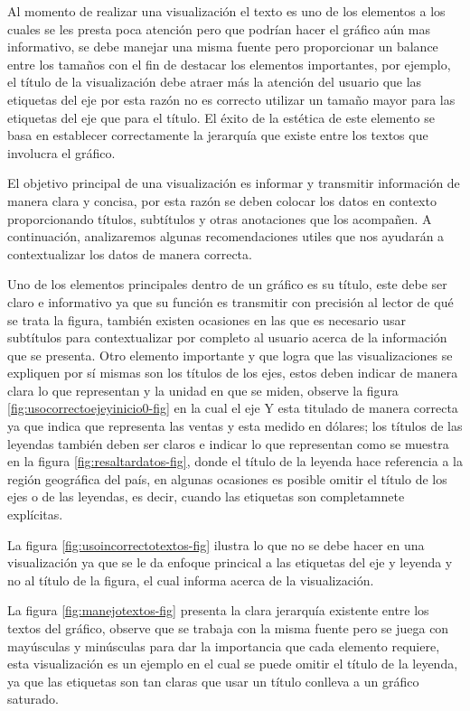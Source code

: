 \documentclass[
]{book}
\begin{document}
Al momento de realizar una visualización el texto es uno de los elementos a los cuales se les presta poca atención pero que podrían hacer el gráfico aún mas informativo, se debe manejar una misma fuente pero proporcionar un balance entre los tamaños con el fin de destacar los elementos importantes, por ejemplo, el título de la visualización debe atraer más la atención del usuario que las etiquetas del eje por esta razón no es correcto utilizar un tamaño mayor para las etiquetas del eje que para el título. El éxito de la estética de este elemento se basa en establecer correctamente la jerarquía que existe entre los textos que involucra el gráfico.

El objetivo principal de una visualización es informar y transmitir información de manera clara y concisa, por esta razón se deben colocar los datos en contexto proporcionando títulos, subtítulos y otras anotaciones que los acompañen. A continuación, analizaremos algunas recomendaciones utiles que nos ayudarán a contextualizar los datos de manera correcta.

Uno de los elementos principales dentro de un gráfico es su título, este debe ser claro e informativo ya que su función es transmitir con precisión al lector de qué se trata la figura, también existen ocasiones en las que es necesario usar subtítulos para contextualizar por completo al usuario acerca de la información que se presenta. Otro elemento importante y que logra que las visualizaciones se expliquen por sí mismas son los títulos de los ejes, estos deben indicar de manera clara lo que representan y la unidad en que se miden, observe la figura \ref{fig:usocorrectoejeyinicio0-fig} en la cual el eje Y esta titulado de manera correcta ya que indica que representa las ventas y esta medido en dólares; los títulos de las leyendas también deben ser claros e indicar lo que representan como se muestra en la figura \ref{fig:resaltardatos-fig}, donde el título de la leyenda hace referencia a la región geográfica del país, en algunas ocasiones es posible omitir el título de los ejes o de las leyendas, es decir, cuando las etiquetas son completamnete explícitas.

La figura \ref{fig:usoincorrectotextos-fig} ilustra lo que no se debe hacer en una visualización ya que se le da enfoque princical a las etiquetas del eje y leyenda y no al título de la figura, el cual informa acerca de la visualización.

La figura \ref{fig:manejotextos-fig} presenta la clara jerarquía existente entre los textos del gráfico, observe que se trabaja con la misma fuente pero se juega con mayúsculas y minúsculas para dar la importancia que cada elemento requiere, esta visualización es un ejemplo en el cual se puede omitir el título de la leyenda, ya que las etiquetas son tan claras que usar un título conlleva a un gráfico saturado.
\end{document}
